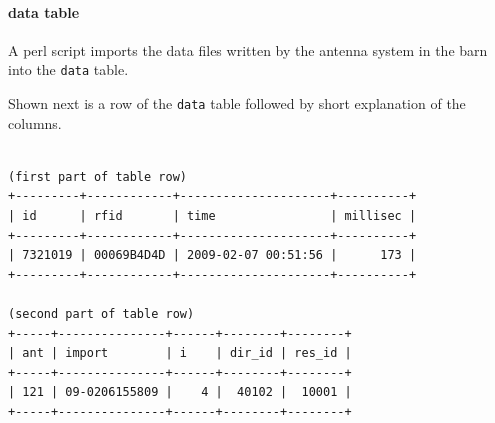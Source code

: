 \paragraph{data table}
\label{para:data_table}

A \ac{perl} script imports the data files written by the antenna system in the barn into the \lstinline|data| table.

Shown next is a row of the \lstinline|data| table followed by short explanation of the columns.

\codescript
\begin{lstlisting}[frame=none]

(first part of table row)
+---------+------------+---------------------+----------+
| id      | rfid       | time                | millisec |
+---------+------------+---------------------+----------+
| 7321019 | 00069B4D4D | 2009-02-07 00:51:56 |      173 |
+---------+------------+---------------------+----------+

(second part of table row)
+-----+---------------+------+--------+--------+
| ant | import        | i    | dir_id | res_id |
+-----+---------------+------+--------+--------+
| 121 | 09-0206155809 |    4 |  40102 |  10001 |
+-----+---------------+------+--------+--------+

\end{lstlisting}

